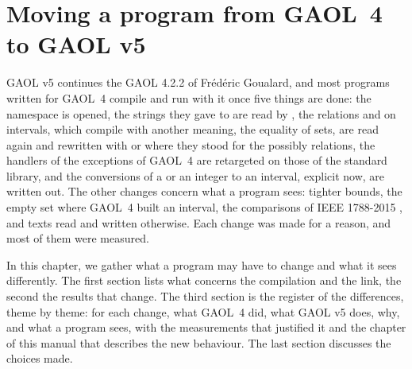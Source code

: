\chapter{Moving a program from GAOL~4 to GAOL v5}\label{chap:changes}
%
%

GAOL v5 continues the GAOL 4.2.2 of Fr\'ed\'eric Goualard, and most programs
written for GAOL~4 compile and run with it once five things are done: the
namespace is opened, the strings they gave to 
are read by , the relations \code{==} and \code{!=} on
intervals, which compile with another meaning, the equality of sets, are read
again and rewritten with  or 
where they stood for the possibly relations, the handlers of the exceptions of GAOL~4 are
retargeted on those of the standard library, and the conversions of a
 or an integer to an interval, explicit now, are written out.
The other changes concern what a program
sees: tighter bounds, the empty set where GAOL~4 built an interval, the
comparisons of IEEE 1788-2015 \cite{IEEE1788:2015}, and texts read and written
otherwise. Each change was made for a reason, and most of them were measured.

\medskip
In this chapter, we gather what a program may have to change and what it
sees differently. The first section lists what concerns the compilation and
the link, the second the results that change. The third section is the
register of the differences, theme by theme: for each change, what GAOL~4
did, what GAOL v5 does, why, and what a program sees, with the measurements
that justified it and the chapter of this manual that describes the new
behaviour. The last section discusses the choices made.

